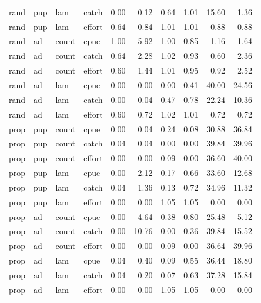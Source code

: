\documentclass[11pt]{article}
\begin{document}
\begin{longtable}{llllrrrrrr}
  rand & pup & lam & catch & 0.00 & 0.12 & 0.64 & 1.01 & 15.60 & 1.36 \\
  rand & pup & lam & effort & 0.64 & 0.84 & 1.01 & 1.01 & 0.88 & 0.88 \\
  rand & ad & count & cpue & 1.00 & 5.92 & 1.00 & 0.85 & 1.16 & 1.64 \\
  rand & ad & count & catch & 0.64 & 2.28 & 1.02 & 0.93 & 0.60 & 2.36 \\
  rand & ad & count & effort & 0.60 & 1.44 & 1.01 & 0.95 & 0.92 & 2.52 \\
  rand & ad & lam & cpue & 0.00 & 0.00 & 0.00 & 0.41 & 40.00 & 24.56 \\
  rand & ad & lam & catch & 0.00 & 0.04 & 0.47 & 0.78 & 22.24 & 10.36 \\
  rand & ad & lam & effort & 0.60 & 0.72 & 1.02 & 1.01 & 0.72 & 0.72 \\
  prop & pup & count & cpue & 0.00 & 0.04 & 0.24 & 0.08 & 30.88 & 36.84 \\
  prop & pup & count & catch & 0.04 & 0.04 & 0.00 & 0.00 & 39.84 & 39.96 \\
  prop & pup & count & effort & 0.00 & 0.00 & 0.09 & 0.00 & 36.60 & 40.00 \\
  prop & pup & lam & cpue & 0.00 & 2.12 & 0.17 & 0.66 & 33.60 & 12.68 \\
  prop & pup & lam & catch & 0.04 & 1.36 & 0.13 & 0.72 & 34.96 & 11.32 \\
  prop & pup & lam & effort & 0.00 & 0.00 & 1.05 & 1.05 & 0.00 & 0.00 \\
  prop & ad & count & cpue & 0.00 & 4.64 & 0.38 & 0.80 & 25.48 & 5.12 \\
  prop & ad & count & catch & 0.00 & 10.76 & 0.00 & 0.36 & 39.84 & 15.52 \\
  prop & ad & count & effort & 0.00 & 0.00 & 0.09 & 0.00 & 36.64 & 39.96 \\
  prop & ad & lam & cpue & 0.04 & 0.40 & 0.09 & 0.55 & 36.44 & 18.80 \\
  prop & ad & lam & catch & 0.04 & 0.20 & 0.07 & 0.63 & 37.28 & 15.84 \\
  prop & ad & lam & effort & 0.00 & 0.00 & 1.05 & 1.05 & 0.00 & 0.00 \\
   \hline
\end{longtable}

\pagebreak
\end{document}
